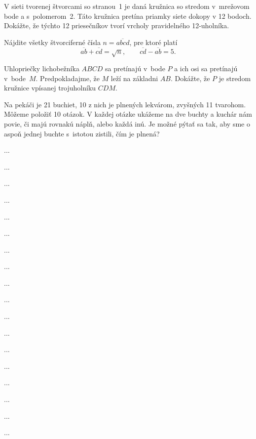 {%
V sieti tvorenej štvorcami so stranou~1 je daná kružnica so stredom v~mrežovom bode a s~polomerom~2. Táto kružnica pretína priamky siete dokopy v 12 bodoch. Dokážte, že týchto 12 priesečníkov tvorí vrcholy pravidelného 12-uholníka.
%
}

{%
Nájdite všetky štvorciferné čísla $n=\overline{abcd}$, pre ktoré platí
$$
\overline{ab}+\overline{cd}=\sqrt{n}, \qquad \overline{cd}-\overline{ab}=5.
$$
}

{%
Uhlopriečky lichobežníka $ABCD$ sa pretínajú v~bode $P$ a ich osi sa pretínajú v~bode~$M$. Predpokladajme, že $M$ leží na základni $AB$. Dokážte, že $P$ je stredom kružnice vpísanej trojuholníku $CDM$.
%
}

{%
Na pekáči je 21 buchiet, 10 z nich je plnených lekvárom, zvyšných 11 tvarohom. Môžeme položiť 10 otázok. V každej otázke ukážeme na dve buchty a kuchár nám povie, či majú rovnakú náplň, alebo každá inú. Je možné pýtať sa tak, aby sme o aspoň jednej buchte s~istotou zistili, čím je plnená?
}

{%
...}

{%
...}

{%
...}

{%
...}

{%
...}

{%
...}

{%
...}

{%
...}

{%
...}

{%
...}

{%
...}

{%
...}

{%
...}

{%
...}

{%
...}

{%
...}

{%
...}

{%
...}

